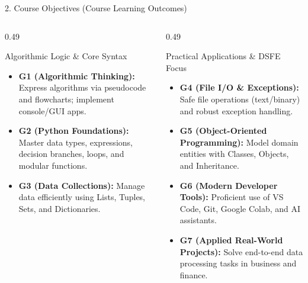 \documentclass[aspectratio=169, 10pt]{beamer}
\begin{document}
\begin{frame}{2. Course Objectives (Course Learning Outcomes)}
  \begin{columns}[T]
    \begin{column}{0.49\textwidth}
      \begin{cbox}[primaryblue]{Algorithmic Logic \& Core Syntax}
        \footnotesize
        \begin{itemize}\setlength{\itemsep}{3pt}
          \item \textbf{G1 (Algorithmic Thinking):} Express algorithms via pseudocode and flowcharts; implement console/GUI apps.
          \item \textbf{G2 (Python Foundations):} Master data types, expressions, decision branches, loops, and modular functions.
          \item \textbf{G3 (Data Collections):} Manage data efficiently using Lists, Tuples, Sets, and Dictionaries.
        \end{itemize}
      \end{cbox}
    \end{column}
    \begin{column}{0.49\textwidth}
      \begin{cbox}[secondarygreen]{Practical Applications \& DSFE Focus}
        \footnotesize
        \begin{itemize}\setlength{\itemsep}{3pt}
          \item \textbf{G4 (File I/O \& Exceptions):} Safe file operations (text/binary) and robust exception handling.
          \item \textbf{G5 (Object-Oriented Programming):} Model domain entities with Classes, Objects, and Inheritance.
          \item \textbf{G6 (Modern Developer Tools):} Proficient use of VS Code, Git, Google Colab, and AI assistants.
          \item \textbf{G7 (Applied Real-World Projects):} Solve end-to-end data processing tasks in business and finance.
        \end{itemize}
      \end{cbox}
    \end{column}
  \end{columns}
\end{frame}
\end{document}
